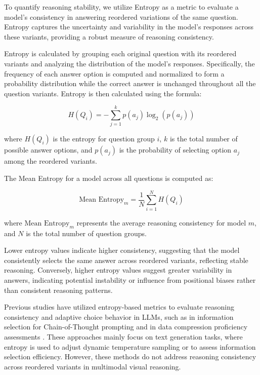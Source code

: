 To quantify reasoning stability, we utilize Entropy as a metric to evaluate a model's consistency in answering reordered variations of the same question. Entropy captures the uncertainty and variability in the model’s responses across these variants, providing a robust measure of reasoning consistency.

Entropy is calculated by grouping each original question with its reordered variants and analyzing the distribution of the model's responses. Specifically, the frequency of each answer option is computed and normalized to form a probability distribution while the correct answer is unchanged throughout all the question variants. Entropy is then calculated using the formula:

\begin{equation}
    H(Q_i) = - \sum_{j=1}^{k} p(a_j) \log_2(p(a_j))
    \label{eq:entropy}
\end{equation}

where \( H(Q_i) \) is the entropy for question group \( i \), \( k \) is the total number of possible answer options, and \( p(a_j) \) is the probability of selecting option \( a_j \) among the reordered variants.

The Mean Entropy for a model across all questions is computed as:

\begin{equation}
    \text{Mean Entropy}_m = \frac{1}{N} \sum_{i=1}^{N} H(Q_i)
    \label{eq:mean_entropy}
\end{equation}

where \( \text{Mean Entropy}_m \) represents the average reasoning consistency for model \( m \), and \( N \) is the total number of question groups. 

Lower entropy values indicate higher consistency, suggesting that the model consistently selects the same answer across reordered variants, reflecting stable reasoning. Conversely, higher entropy values suggest greater variability in answers, indicating potential instability or influence from positional biases rather than consistent reasoning patterns.

Previous studies have utilized entropy-based metrics to evaluate reasoning consistency and adaptive choice behavior in LLMs, such as in information selection for Chain-of-Thought prompting \cite{inform_entropy_reasoning} and in data compression proficiency assessments \cite{matrix_entropy_llm}. These approaches mainly focus on text generation tasks, where entropy is used to adjust dynamic temperature sampling or to assess information selection efficiency. However, these methods do not address reasoning consistency across reordered variants in multimodal visual reasoning. 

